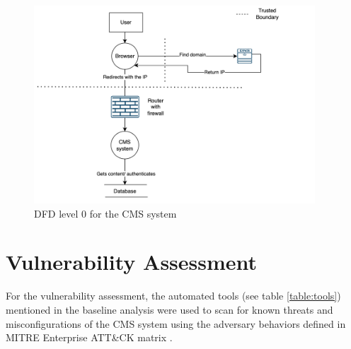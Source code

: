 \begin{figure}[h!]
\centering
\includegraphics[width=\textwidth, height=280px]{pics/dfd.png}
\caption{DFD level 0 for the CMS system}\label{fig:dfd}
\end{figure}


\section{Vulnerability Assessment}
For the vulnerability assessment, the automated tools (see table \ref{table:tools}) mentioned in the baseline analysis were used to scan for known threats and misconfigurations of the CMS system using the adversary behaviors defined in MITRE Enterprise ATT\&CK matrix \citep[p.~158]{xiong2022cyber}.

